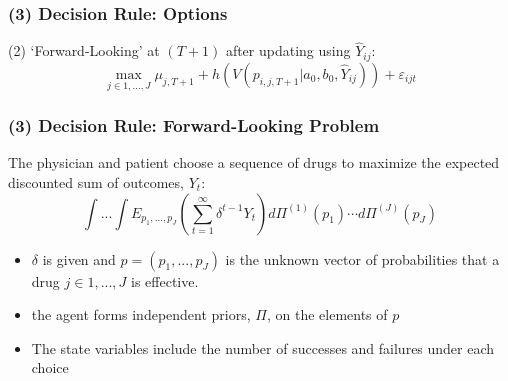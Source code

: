 \documentclass[xcolor=pdftex,dvipsnames,table,mathserif,aspectratio=169]{beamer}
\begin{document}

\begin{frame}
\frametitle{(3) Decision Rule: Options}
\small

(2) `Forward-Looking' at $(T+1)$ after updating using $\widehat{Y}_{ij}$:%
\[
\max_{j\in 1,...,J}\mu _{j,T+1} + h(V(p_{i,j,T+1}|a_{0},b_{0},\widehat{Y}%
_{ij})) + \varepsilon_{ijt} 
\]
\end{frame}


\begin{frame}
\frametitle{(3) Decision Rule: Forward-Looking Problem}
\small

The physician and patient choose a sequence of drugs to maximize the
expected discounted sum of outcomes, $Y_{t}$: 
\begin{equation}
\int ...\int E_{p_{1},...,p_{J}}\left( \sum_{t=1}^{\infty }\delta
^{t-1}Y_{t}\right) d\Pi ^{(1)}(p_{1})\cdots d\Pi ^{(J)}(p_{J})
\label{seq_prob}
\end{equation}

\begin{itemize}
\item $\delta$ is given and $p=(p_{1},...,p_{J})$ is the unknown vector of
probabilities that a drug $j\in{1,...,J}$ is effective.

\item the agent forms independent priors, $\Pi $, on the elements of $p$

\item The state variables include the number of successes and failures under
each choice
\end{itemize}
\end{frame}

\end{document}
